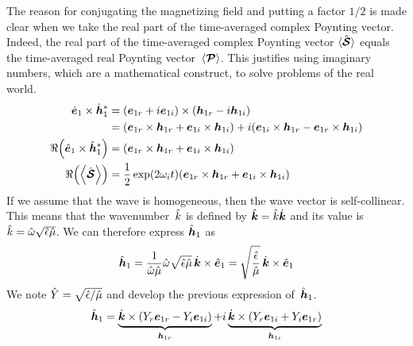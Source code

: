 The reason for conjugating the magnetizing field and putting a factor $1/2$ is made clear when we take the real part of the time-averaged complex Poynting vector.
Indeed, the real part of the time-averaged complex Poynting vector $\langle \hat{\bm{\mathcal{S}}} \rangle$ equals the time-averaged real Poynting vector~$\langle \bm{\mathcal{P}} \rangle$.
This justifies using imaginary numbers, which are a mathematical construct, to solve problems of the real world.
\begin{subequations}
    \begin{align}
        \vectcp{e}_1 \times \vectcp{h}_1^*
        &=
        ( \vect{e}_{1\re} + i \vect{e}_{1\im} )
        \times
        ( \vect{h}_{1\re} - i \vect{h}_{1\im} )
        \\
        &=
        (
            \vect{e}_{1\re} \times \vect{h}_{1\re}
            +
            \vect{e}_{1\im} \times \vect{h}_{1\im}
        )
        +
        i
        (
            \vect{e}_{1\im} \times \vect{h}_{1\re}
            -
            \vect{e}_{1\re} \times \vect{h}_{1\im}
        )
        \\
        \Re\left( \vectcp{e}_1 \times \vectcp{h}_1^* \right)
        &=
        (
            \vect{e}_{1\re} \times \vect{h}_{1\re}
            +
            \vect{e}_{1\im} \times \vect{h}_{1\im}
        )
        \\
        \Re\left( \Timeavg{\vectcp{\power{S}}} \right)
        &=
        \frac{1}{2}
        \exp(2\omega_\im t)
        (
            \vect{e}_{1\re} \times \vect{h}_{1\re}
            +
            \vect{e}_{1\im} \times \vect{h}_{1\im}
        )
    \end{align}
\end{subequations}
If we assume that the wave is homogeneous, then the wave vector is self-collinear.
This means that the wavenumber~$\hat{k}$ is defined by $\hat{\bm{k}} = \hat{k} \dot{\bm{k}}$ and its value is $\hat{k}=\hat{\omega} \sqrt{\hat{\epsilon} \hat{\mu}}$.
We can therefore express $\hat{\bm{h}}_1$ as
\begin{equation}
    \hat{\bm{h}}_1
    =
    \frac{1}{\hat{\omega} \hat{\mu}}
    \hat{\omega} \sqrt{\hat{\epsilon} \hat{\mu}} \, \dot{\bm{k}} \times \hat{\bm{e}}_1
    =
    \sqrt{\frac{\hat{\epsilon}}{\hat{\mu}}} \, \dot{\bm{k}} \times \hat{\bm{e}}_1
\end{equation}
We note $\hat{Y}=\sqrt{\hat{\epsilon}/\hat{\mu}}$ and develop the previous expression of~$\hat{\bm{h}}_1$.
\begin{equation}
    \hat{\bm{h}}_1
    =
    \underbrace{\dot{\bm{k}} \times
                (Y_r \bm{e}_{1r} -
                 Y_i \bm{e}_{1i})
               }_{\bm{h}_{1r}}
    +i
    \underbrace{\dot{\bm{k}} \times
                (Y_r \bm{e}_{1i} +
                 Y_i \bm{e}_{1r})
               }_{\bm{h}_{1i}}
    \label{eq:h_y_e_phase_difference}
\end{equation}
